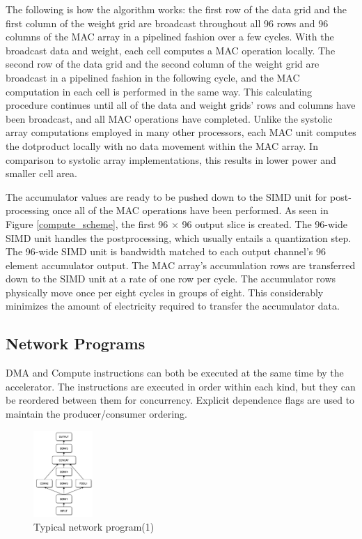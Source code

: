 \documentclass[letterpaper, 10 pt, conference]{ieeeconf}  %
\begin{document}
The following is how the algorithm works: the first row of the data grid and the first column of the weight grid are broadcast throughout all 96 rows and 96 columns of the MAC array in a pipelined fashion over a few cycles. With the broadcast data and weight, each cell computes a MAC operation locally. The second row of the data grid and the second column of the weight grid are broadcast in a pipelined fashion in the following cycle, and the MAC computation in each cell is performed in the same way. This calculating procedure continues until all of the data and weight grids' rows and columns have been broadcast, and all MAC operations have completed. Unlike the systolic array computations employed in many other processors, each MAC unit computes the dotproduct locally with no data movement within the MAC array. In comparison to systolic array implementations, this results in lower power and smaller cell area\cite{fsd_computer}.

The accumulator values are ready to be pushed down to the SIMD unit for post-processing once all of the MAC operations have been performed. As seen in Figure \ref{compute_scheme}, the first 96 × 96 output slice is created. The 96-wide SIMD unit handles the postprocessing, which usually entails a quantization step. The 96-wide SIMD unit is bandwidth matched to each output channel's 96 element accumulator output. The MAC array's accumulation rows are transferred down to the SIMD unit at a rate of one row per cycle. The accumulator rows physically move once per eight cycles in groups of eight\cite{fsd_computer}. This considerably minimizes the amount of electricity required to transfer the accumulator data.

\subsection{Network Programs}

DMA and Compute instructions can both be executed at the same time by the accelerator. The instructions are executed in order within each kind, but they can be reordered between them for concurrency. Explicit dependence flags are used to maintain the producer/consumer ordering. 

\begin{figure}[hbt!]
\centering
\includegraphics[width=0.2\textwidth]{gfx/typical_network_program.png}
\caption{Typical network program(1)}
\label{typical_network_program}
\end{figure}
\end{document}
